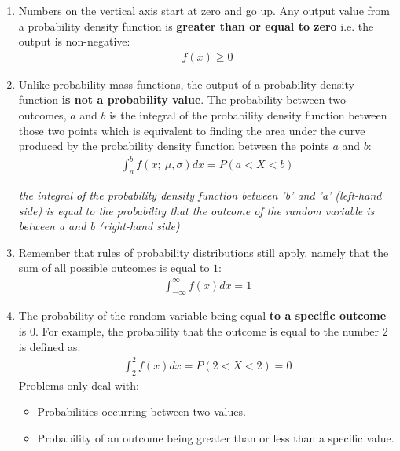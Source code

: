 \documentclass[10pt,a4paper]{article}
\begin{document}
\begin{enumerate}
    \item Numbers on the vertical axis start at zero and go up. Any output value from a probability
    density function is \textbf{greater than or equal to zero} i.e. the output is non-negative:
    \begin{align*}
        f(x) \geq 0
    \end{align*}
    \item Unlike probability mass functions, the output of a probability density function \textbf{is
    not a probability value}. The probability between two outcomes, $a$ and $b$ is the integral of the probability density function between those two points which is equivalent to finding the area under the curve produced by the probability density function between the points $a$ and $b$:
    \begin{align*}
        \int_a^b f(x;\: \mu, \sigma) dx = P(a<X<b)
    \end{align*}
    \begin{center}
        \textit{the integral of the probability density function between 'b' and 'a' (left-hand side) is equal to the probability that the outcome of the random variable is between a and b (right-hand side)}
    \end{center}
    \item Remember that rules of probability distributions still apply, namely that the sum of all possible outcomes is equal to $1$:
    \begin{align*}
        \int_{-\infty}^\infty f(x) dx = 1
    \end{align*}
    \item The probability of the random variable being equal \textbf{to a specific outcome} is $0$.
    For example, the probability that the outcome is equal to the number $2$ is defined as:
    \begin{align*}
        \int^2_2 f(x)dx = P(2<X<2) = 0
    \end{align*}
    Problems only deal with: 
    \begin{itemize}
        \item Probabilities occurring between two values.
        \item Probability of an outcome being greater than or less than a specific value.
    \end{itemize}
\end{enumerate}
\end{document}
